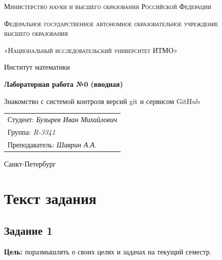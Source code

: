 \documentclass[a4paper,14pt]{extarticle}
\begin{document}
\begin{titlepage}
    \centering
    {\scshape\large Министерство науки и высшего образования Российской Федерации\par}
    \vspace{0.5cm}
    {\scshape\large Федеральное государственное автономное образовательное учреждение\\
    высшего образования\par}
    {\scshape\large «Национальный исследовательский университет ИТМО»\par}
    \vspace{0.5cm}
    {\large Институт математики\par}
    \vspace{3cm}

    {\Large\bfseries Лабораторная работа №0 (вводная)\par}
    \vspace{0.5cm}
    {\large Знакомство с системой контроля версий git и сервисом GitHub\par}
    \vspace{3cm}

    \begin{flushright}
        \begin{tabular}{l}
            Студент: \textit{Бузырев Иван Михайлович}\\
            Группа: \textit{R-3341}\\
            Преподаватель: \textit{Шаврин А.А.}
        \end{tabular}
    \end{flushright}

    \vfill
    {\large Санкт-Петербург\\ \the\year\par}
\end{titlepage}

\tableofcontents
\newpage

\section{Текст задания}

\subsection*{Задание 1}
\textbf{Цель:} поразмышлять о своих целях и задачах на текущий семестр.
\end{document}
